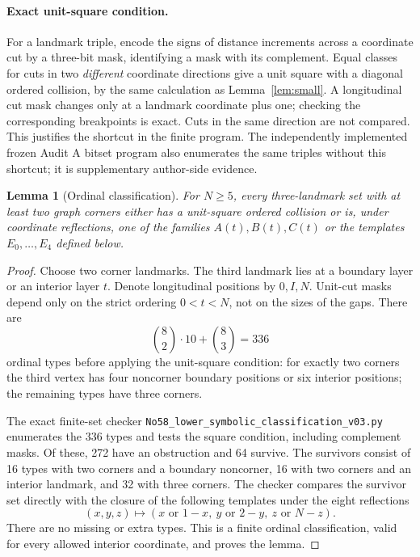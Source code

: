\documentclass[11pt,a4paper]{article}
\newcommand{\code}[1]{{\small\nolinkurl{#1}}}
\newtheorem{lemma}{Lemma}
\begin{document}
\paragraph{Exact unit-square condition.}
For a landmark triple, encode the signs of distance increments across a coordinate cut by a three-bit mask, identifying a mask with its complement. Equal classes for cuts in two \emph{different} coordinate directions give a unit square with a diagonal ordered collision, by the same calculation as Lemma~\ref{lem:small}. A longitudinal cut mask changes only at a landmark coordinate plus one; checking the corresponding breakpoints is exact. Cuts in the same direction are not compared. This justifies the shortcut in the finite program. The independently implemented frozen Audit A bitset program also enumerates the same triples without this shortcut; it is supplementary author-side evidence.

\begin{lemma}[Ordinal classification]\label{lem:types}
For $N\ge5$, every three-landmark set with at least two graph corners either has a unit-square ordered collision or is, under coordinate reflections, one of the families $A(t),B(t),C(t)$ or the templates $E_0,\ldots,E_4$ defined below.
\end{lemma}
\begin{proof}
Choose two corner landmarks. The third landmark lies at a boundary layer or an interior layer $t$. Denote longitudinal positions by $0,I,N$. Unit-cut masks depend only on the strict ordering $0<t<N$, not on the sizes of the gaps. There are
\[
\binom82\cdot10+\binom83=336
\]
ordinal types before applying the unit-square condition: for exactly two corners the third vertex has four noncorner boundary positions or six interior positions; the remaining types have three corners.

The exact finite-set checker \code{No58_lower_symbolic_classification_v03.py} enumerates the 336 types and tests the square condition, including complement masks. Of these, 272 have an obstruction and 64 survive. The survivors consist of 16 types with two corners and a boundary noncorner, 16 with two corners and an interior landmark, and 32 with three corners. The checker compares the survivor set directly with the closure of the following templates under the eight reflections
\[
(x,y,z)\longmapsto (x\text{ or }1-x,\ y\text{ or }2-y,\ z\text{ or }N-z).
\]
There are no missing or extra types. This is a finite ordinal classification, valid for every allowed interior coordinate, and proves the lemma.
\end{proof}
\end{document}
